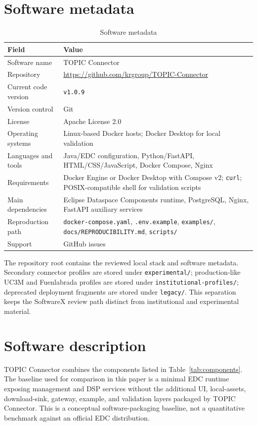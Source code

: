 \documentclass[preprint,12pt]{elsarticle}
\begin{document}
\section{Software metadata}
\begin{table}[t]
\caption{Software metadata}
\label{tab:metadata}
\centering
\begin{tabular}{p{4.0cm} p{9.0cm}}
\toprule
\textbf{Field} & \textbf{Value} \\
\midrule
Software name & TOPIC Connector \\
Repository & \url{https://github.com/krgroup/TOPIC-Connector} \\
Current code version & \texttt{v1.0.9} \\
Version control & Git \\
License & Apache License 2.0 \\
Operating systems & Linux-based Docker hosts; Docker Desktop for local validation \\
Languages and tools & Java/EDC configuration, Python/FastAPI, HTML/CSS/JavaScript, Docker Compose, Nginx \\
Requirements & Docker Engine or Docker Desktop with Compose v2; \texttt{curl}; POSIX-compatible shell for validation scripts \\
Main dependencies & Eclipse Dataspace Components runtime, PostgreSQL, Nginx, FastAPI auxiliary services \\
Reproduction path & \texttt{docker-compose.yaml}, \texttt{.env.example}, \texttt{examples/}, \texttt{docs/REPRODUCIBILITY.md}, \texttt{scripts/} \\
Support & GitHub issues \\
\bottomrule
\end{tabular}
\end{table}

The repository root contains the reviewed local stack and software metadata. Secondary connector profiles are stored under \texttt{experimental/}; production-like UC3M and Fuenlabrada profiles are stored under \texttt{institutional-profiles/}; deprecated deployment fragments are stored under \texttt{legacy/}. This separation keeps the SoftwareX review path distinct from institutional and experimental material.

\section{Software description}
TOPIC Connector combines the components listed in Table~\ref{tab:components}. The baseline used for comparison in this paper is a minimal EDC runtime exposing management and DSP services without the additional UI, local-assets, download-sink, gateway, example, and validation layers packaged by TOPIC Connector. This is a conceptual software-packaging baseline, not a quantitative benchmark against an official EDC distribution.
\end{document}
